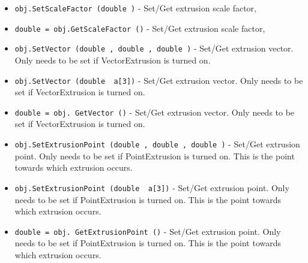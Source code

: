 \begin{itemize}
\item  \verb|obj.SetScaleFactor (double )| -  Set/Get extrusion scale factor,

\item  \verb|double = obj.GetScaleFactor ()| -  Set/Get extrusion scale factor,

\item  \verb|obj.SetVector (double , double , double )| -  Set/Get extrusion vector. Only needs to be set if VectorExtrusion is
 turned on.

\item  \verb|obj.SetVector (double  a[3])| -  Set/Get extrusion vector. Only needs to be set if VectorExtrusion is
 turned on.

\item  \verb|double = obj. GetVector ()| -  Set/Get extrusion vector. Only needs to be set if VectorExtrusion is
 turned on.

\item  \verb|obj.SetExtrusionPoint (double , double , double )| -  Set/Get extrusion point. Only needs to be set if PointExtrusion is
 turned on. This is the point towards which extrusion occurs.

\item  \verb|obj.SetExtrusionPoint (double  a[3])| -  Set/Get extrusion point. Only needs to be set if PointExtrusion is
 turned on. This is the point towards which extrusion occurs.

\item  \verb|double = obj. GetExtrusionPoint ()| -  Set/Get extrusion point. Only needs to be set if PointExtrusion is
 turned on. This is the point towards which extrusion occurs.

\end{itemize}
